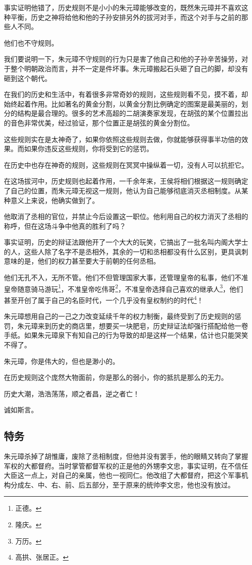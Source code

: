 \begin{multicols}{\theparacolNo}
		事实证明他错了，历史规则不是小小的朱元璋能够改变的，既然朱元璋并不喜欢这种平衡，历史之神将给他和他的子孙安排另外的拔河对手，而这个对手与之前的那些人不同。

		他们也不守规则。

		我们要说明一下，朱元璋不守规则的行为只是害了他自己和他的子孙辛苦操劳，对于整个明朝政治而言，并不一定是件坏事。朱元璋搬起石头砸了自己的脚，却没有砸到这个朝代。

		在我们的历史和生活中，有着很多非常奇妙的规则，这些规则看不见，摸不着，却始终起着作用。比如著名的黄金分割，以黄金分割比例确定的图案是最美丽的，划分的结构是最合理的。很多的艺术高超的二胡演奏家发现，在胡弦的某个位置拉出的音色非常优美，经过验证，那个位置正是胡弦的黄金分割位。

		这些规则实在是太神奇了，如果你依照这些规则去做，你就能够获得事半功倍的效果。而如果你违反这些规则，你将受到它的惩罚。

		在历史中也存在神奇的规则，这些规则在冥冥中操纵着一切，没有人可以抗拒它。

		在这场拔河中，历史规则也起着作用，一千余年来，王侯将相们根据这一规则确定了自己的位置，而朱元璋无视这一规则，他认为自己能够彻底消灭丞相制度。从某种意义上来说，他确实做到了。

		他取消了丞相的官位，并禁止今后设置这一职位。他利用自己的权力消灭了丞相的称呼，但在这场斗争中他真的胜利了吗？

		事实证明，历史的辩证法跟他开了一个大大的玩笑，它搞出了一批名叫内阁大学士的人，这些人除了名字不是丞相外，其余的一切和丞相都没有什么区别，更具讽刺意味的是，他们的权力甚至要大于前朝的任何丞相。

		他们无孔不入，无所不管。他们不但管理国家大事，还管理皇帝的私事，他们不准皇帝随意骑马游玩\footnote{正德。}，不准皇帝吃伟哥\footnote{隆庆。}，不准皇帝选择自己喜欢的继承人\footnote{万历。}，他们甚至开创了属于自己的名臣时代，一个几乎没有皇权制约的时代\footnote{高拱、张居正。}！

		朱元璋想用自己的一己之力改变延续千年的权力制衡，最终受到了历史规则的惩罚，朱元璋来到历史的商店里，想要买一块肥皂，历史辩证法却强行搭配给他一卷手纸。如果朱元璋泉下有知自己的行为导致的却是这样一个结果，估计也只能哭笑不得了。

		朱元璋，你是伟大的，但也是渺小的。

		在历史规则这个庞然大物面前，你是那么的弱小，你的抵抗是那么的无力。

		历史大潮，浩浩荡荡，顺之者昌，逆之者亡！

		诚如斯言。

		\subsection{特务}
		朱元璋杀掉了胡惟庸，废除了丞相制度，但他并没有罢手，他的眼睛又转向了掌握军权的大都督府。当时掌管都督军权的正是他的外甥李文忠，事实证明，在不信任大臣这一点上，对自己的亲属，他也一视同仁。他改组了大都督府，把这个军事机构分成左、中、右、前、后五部分，至于原来的统帅李文忠，他也没有放过。


\end{multicols}
